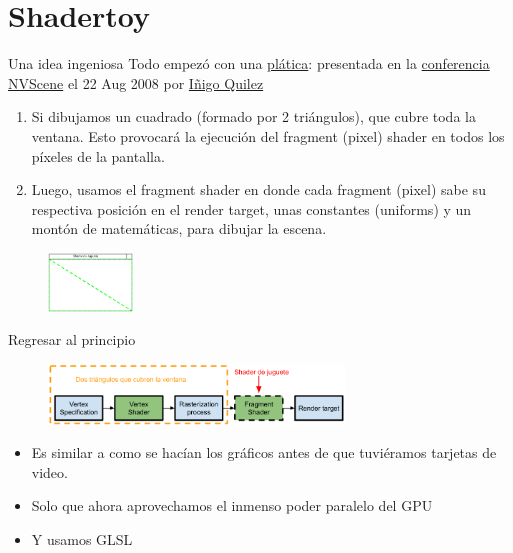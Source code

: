 \section{Shadertoy}

\begin{frame}{Una idea ingeniosa}
Todo empezó con una \href{https://iquilezles.org/articles/nvscene2008/rwwtt.pdf}{plática}:  presentada en la \href{https://www.youtube.com/watch?v=A1iW6Z_Jc4k}{conferencia NVScene} el 22 Aug 2008 por \href{https://iquilezles.org/}{Iñigo Quilez}
\begin{exampleblock}{}
\begin{enumerate}
    \item Si dibujamos un cuadrado (formado por 2 triángulos), que cubre toda la ventana. Esto provocará la ejecución del fragment (pixel) shader en todos los píxeles de la pantalla. 
    \item Luego, usamos el fragment shader en donde cada fragment (pixel) sabe su respectiva posición en el render target, unas constantes (uniforms) y un montón de matemáticas, para dibujar la escena.
\end{enumerate}
\end{exampleblock}
\begin{figure}[htp]
  \centering
  \includegraphics[width=0.2\textwidth]{img/TwoTriangles}
\end{figure}
\end{frame}

\begin{frame}{Regresar al principio}
\begin{figure}[htp]
  \centering
  \includegraphics[width=0.7\textwidth]{img/Truco}
\end{figure}
\begin{itemize}
    \item Es similar a como se hacían los gráficos antes de que tuviéramos tarjetas de video.
    \item Solo que ahora aprovechamos el \alert{inmenso poder paralelo} del GPU
    \item Y usamos GLSL
\end{itemize}
\end{frame}

